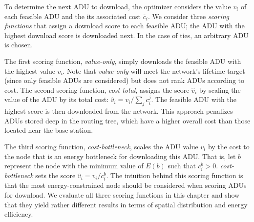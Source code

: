 To determine the next ADU to download, the optimizer considers the value
$v_i$ of each feasible ADU and the its associated cost $\bar{c}_i$. We
consider three \textit{scoring functions} that assign a download score to
each feasible ADU; the ADU with the highest download score is downloaded
next. In the case of ties, an arbitrary ADU is chosen.

The first scoring function, \textit{value-only}, simply downloads the
feasible ADU with the highest value $v_i$. Note that \textit{value-only} will
meet the network's lifetime target (since only feasible ADUs are considered)
but does not rank ADUs according to cost. The second scoring function,
\textit{cost-total}, assigns the score $\hat{v}_i$ by scaling the value of
the ADU by its total cost: $\hat{v}_i = v_i / \sum_j c_i^j$. The feasible ADU
with the highest score is then downloaded from the network. This approach
penalizes ADUs stored deep in the routing tree, which have a higher overall
cost than those located near the base station.

The third scoring function, \textit{cost-bottleneck}, scales the ADU value
$v_i$ by the cost to the node that is an energy bottleneck for downloading
this ADU. That is, let $b$ represent the node with the minimum value of
$E(b)$ such that $c_i^b > 0$. \textit{cost-bottleneck} sets the score
$\hat{v}_i = v_i / c_i^b$. The intuition behind this scoring function is that
the most energy-constrained node should be considered when scoring ADUs for
download. We evaluate all three scoring functions in this chapter and show
that they yield rather different results in terms of spatial distribution and
energy efficiency.
